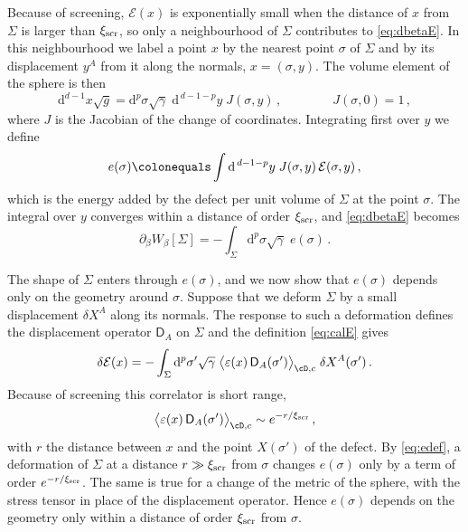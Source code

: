 \documentclass[a4paper,11pt]{article}
\newcommand{\xiscr}{\xi_{\rm scr}}
\newcommand{\dd}{\mathrm{d}}
\newcommand{\sD}{\mathsf{D}}%
\begin{document}
	Because of screening, $\mathcal{E}(x)$ is exponentially small when the distance of $x$ from $\Sigma$ is larger than $\xiscr$, so only a neighbourhood of $\Sigma$ contributes to \eqref{eq:dbetaE}. In this neighbourhood we label a point $x$ by the nearest point $\sigma$ of $\Sigma$ and by its displacement $y^A$ from it along the normals, $x=(\sigma,y)$. The volume element of the sphere is then
	\begin{equation}\label{eq:tube}
		\dd^{d-1}x\sqrt g=\dd^p\sigma\sqrt\gamma\;\dd^{\,d-1-p}y\;J(\sigma,y)\, ,\qquad\qquad J(\sigma,0)=1\, ,
	\end{equation}
	where $J$ is the Jacobian of the change of coordinates. Integrating first over $y$ we define
	\begin{equation}\label{eq:edef}
		e(\sigma)\colonequals\int\dd^{\,d-1-p}y\;J(\sigma,y)\,\mathcal{E}(\sigma,y)\, ,
	\end{equation}
	which is the energy added by the defect per unit volume of $\Sigma$ at the point $\sigma$. The integral over $y$ converges within a distance of order $\xiscr$, and \eqref{eq:dbetaE} becomes
	\begin{equation}\label{eq:edens}
		\partial_\beta W_\beta[\Sigma]=-\int_\Sigma\dd^p\sigma\sqrt\gamma\;e(\sigma)\, .
	\end{equation}
	
	The shape of $\Sigma$ enters through $e(\sigma)$, and we now show that $e(\sigma)$ depends only on the geometry around $\sigma$. Suppose that we deform $\Sigma$ by a small displacement $\delta X^A$ along its normals. The response to such a deformation defines the displacement operator $\sD_A$ on $\Sigma$ and the definition \eqref{eq:calE} gives
	\begin{equation}\label{eq:deltaE}
		\delta\mathcal{E}(x)=-\int_\Sigma\dd^p\sigma'\sqrt\gamma\;\bigl\langle\varepsilon(x)\,\sD_A(\sigma')\bigr\rangle_{\cD,c}\;\delta X^A(\sigma')\, .
	\end{equation}
	Because of screening this correlator is short range,
	\begin{equation}\label{eq:screenED}
		\bigl\langle\varepsilon(x)\,\sD_A(\sigma')\bigr\rangle_{\cD,c}\sim e^{-r/\xiscr}\, ,
	\end{equation}
	with $r$ the distance between $x$ and the point $X(\sigma')$ of the defect. By \eqref{eq:edef}, a deformation of $\Sigma$ at a distance $r\gg\xiscr$ from $\sigma$ changes $e(\sigma)$ only by a term of order $e^{-r/\xiscr}$. The same is true for a change of the metric of the sphere, with the stress tensor in place of the displacement operator. Hence $e(\sigma)$ depends on the geometry only within a distance of order $\xiscr$ from $\sigma$.
	
\end{document}
